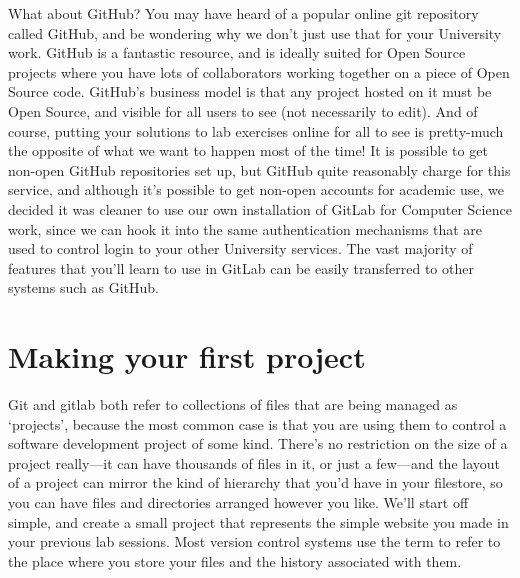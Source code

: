 \begin{diversion}{What about GitHub?}
You may have heard of a popular online git repository called GitHub, and be wondering why we don't just use that for your University work. GitHub is a fantastic resource, and is ideally suited for Open Source projects where you have lots of collaborators working together on a piece of Open Source code. GitHub's business model is that any project hosted on it must be Open Source, and visible for all users to see (not necessarily to edit). And of course, putting your solutions to lab exercises online for all to see is pretty-much the opposite of what we want to happen most of the time! It is possible to get non-open GitHub repositories set up, but GitHub quite reasonably charge for this service, and although it's possible to get non-open accounts for academic use, we decided it was cleaner to use our own installation of GitLab for Computer Science work, since we can hook it into the same authentication mechanisms that are used to control login to your other University services. The vast majority of features that you'll learn to use in GitLab can be easily transferred to other systems such as GitHub.
\end{diversion}

\section{Making your first project}

Git and gitlab both refer to collections of files that are being managed as `projects', because the most common case is that you are using them to control a software development project of some kind. There's no restriction on the size of a project really---it can have thousands of files in it, or just a few---and the layout of a project can mirror the kind of hierarchy that you'd have in your filestore, so you can have files and directories arranged however you like. We'll start off simple, and create a small project that represents the simple website you made in your previous lab sessions. Most version control systems use the term  to refer to the place where you store your files and the history associated with them. 

